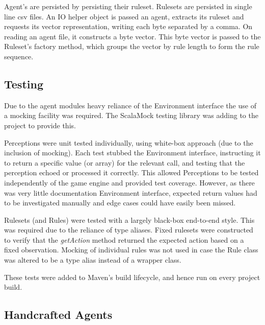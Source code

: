 Agent's are persisted by persisting their ruleset. Rulesets are persisted in single line csv files. An IO helper object is passed an agent, extracts its ruleset and requests its vector representation, writing each byte separated by a comma. On reading an agent file, it constructs a byte vector. This byte vector is passed to the Ruleset's factory method, which groups the vector by rule length to form the rule sequence.


\subsection{Testing}

Due to the agent modules heavy reliance of the Environment interface the use of a mocking facility was required. The ScalaMock testing library was adding to the project to provide this.

Perceptions were unit tested individually, using white-box approach (due to the inclusion of mocking). Each test stubbed the Environment interface, instructing it to return a specific value (or array) for the relevant call, and testing that the perception echoed or processed it correctly. This allowed Perceptions to be tested independently of the game engine and provided test coverage. However, as there was very little documentation Environment interface, expected return values had to be investigated manually and edge cases could have easily been missed.

Rulesets (and Rules) were tested with a largely black-box end-to-end style. This was required due to the reliance of type aliases. Fixed rulesets were constructed to verify that the \emph{getAction} method returned the expected action based on a fixed observation. Mocking of individual rules was not used in case the Rule class was altered to be a type alias instead of a wrapper class.

These tests were added to Maven's build lifecycle, and hence run on every project build.


\subsection{Handcrafted Agents}
\label{subsec:hca}

